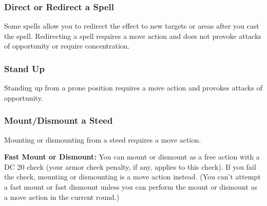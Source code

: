 \subsubsection{Direct or Redirect a Spell}
Some spells allow you to redirect the effect to new targets or areas after you cast the spell. Redirecting a spell requires a move action and does not provoke attacks of opportunity or require concentration.

\subsubsection{Stand Up}
Standing up from a prone position requires a move action and provokes attacks of opportunity.

\subsubsection{Mount/Dismount a Steed}
Mounting or dismounting from a steed requires a move action.

\textbf{Fast Mount or Dismount:} You can mount or dismount as a free action with a DC 20  check (your armor check penalty, if any, applies to this check). If you fail the check, mounting or dismounting is a move action instead. (You can't attempt a fast mount or fast dismount unless you can perform the mount or dismount as a move action in the current round.)

